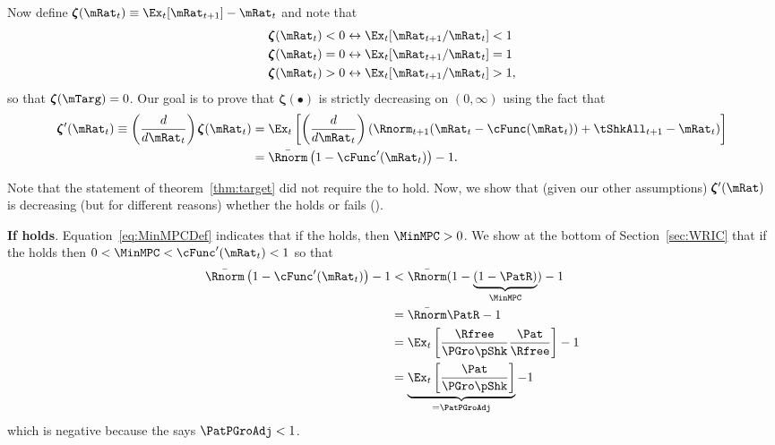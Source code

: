 \documentclass[BufferStockTheory]{subfiles}
\begin{document}
Now define \providecommand{\difFunc}{\pmb{\zeta}} $\difFunc(\mRat_t) \equiv 
\Ex_t[\mRat_{t+1}] - \mRat_t$ and note that
\begin{align}\label{eq:difRatioEquiv}
  \difFunc(\mRat_t) < 0 &\leftrightarrow \Ex_t[{\mRat}_{t+1}/\mRat_t] < 1 
                          \nonumber\\
  \difFunc(\mRat_t) = 0 &\leftrightarrow \Ex_t[{\mRat}_{t+1}/\mRat_t] = 1\\
  \difFunc(\mRat_t) > 0 &\leftrightarrow \Ex_t[{\mRat}_{t+1}/\mRat_t] > 
                          1,\nonumber
\end{align}
so that $\difFunc(\mTarg)=0$. Our goal is to prove that $\difFunc(\bullet)$ is strictly 
decreasing on $(0,\infty)$ using the fact that
\begin{align}
  \difFunc^{\prime}(\mRat_{t}) \equiv  \left( \frac{d}{d\mRat_{t}}\right) \difFunc(\mRat_t)  & = \Ex_{t}\left[
                                                                                               \left( \frac{d}{d\mRat_{t}}\right) \left( 
                                                                                               {\Rnorm}_{t+1}(\mRat_{t}-\cFunc(\mRat_{t}))+%
                                                                                               {\tShkAll}_{t+1} - {\mRat}_t\right) \right] \label{eq:difFuncDecreases} \\
                                                                                             & = \bar{\Rnorm}\left(1-\cFunc^{\prime}({\mRat}_t)\right) - 1.  \notag
\end{align}

Note that the statement of theorem~\ref{thm:target} did not require the {\RIC} to hold.  Now, we show that (given our other assumptions) $\difFunc^{\prime}(\mRat)$ is decreasing (but for different reasons) whether the {\RIC} holds or fails (\cncl{\RIC}).

\textbf{If {\RIC} holds}. Equation~\eqref{eq:MinMPCDef} indicates that if the {\RIC} holds, then $\MinMPC >0$.  We show at the bottom of Section~\ref{sec:WRIC} that if the {\RIC} holds then $0 < \MinMPC < \cFunc^{\prime}(\mRat_{t}) < 1$ so that 
\begin{align*}
  \bar{\Rnorm}\left(1-\cFunc^{\prime}({\mRat}_t)\right) - 1 & <  \bar{\Rnorm}(1-\underbrace{(1-\PatR)}_{\MinMPC}) - 1  \\
                                                            & = \bar{\Rnorm}\PatR - 1 \\
                                                            & = \Ex_{t}\left[\frac{\Rfree}{\PGro \pShk}\frac{\Pat}{\Rfree}\right] - 1 \\
                                                            & = \underbrace{\Ex_{t}\left[\frac{\Pat}{\PGro \pShk}\right]}_{= \PatPGroAdj} - 1 
\end{align*}
which is negative because the {\GIC} says $\PatPGroAdj < 1$.  
\end{document}
